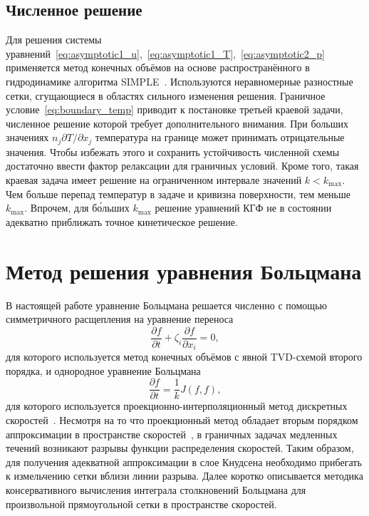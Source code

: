 \documentclass[
aps,%
12pt,%
final,%
notitlepage,%
oneside,%
onecolumn,%
nobibnotes,%
nofootinbib,%
superscriptaddress,%
noshowpacs,%
showkeys,%
centertags]%
{revtex4}
\newcommand{\pder}[2][]{\frac{\partial#1}{\partial#2}}
\newcommand{\Pder}[2][]{\partial#1/\partial#2}
\begin{document}
\subsection{Численное решение}

Для решения системы уравнений~\eqref{eq:asymptotic1_u},~\eqref{eq:asymptotic1_T},~\eqref{eq:asymptotic2_p}
применяется метод конечных объёмов на основе распространённого в гидродинамике алгоритма SIMPLE~\cite{Aoki2007}.
Используются неравномерные разностные сетки, сгущающиеся в областях сильного изменения решения.
Граничное условие~\eqref{eq:boundary_temp} приводит к постановке третьей краевой задачи,
численное решение которой требует дополнительного внимания.
При больших значениях \(n_j\Pder[T]{x_j}\) температура на границе может принимать отрицательные значения.
Чтобы избежать этого и сохранить устойчивость численной схемы достаточно ввести фактор релаксации для граничных условий.
Кроме того, такая краевая задача имеет решение на ограниченном интервале значений \(k<k_{\max}\).
Чем больше перепад температур в задаче и кривизна поверхности, тем меньше \(k_{\max}\).
Впрочем, для б\'{о}льших \(k_{\max}\) решение уравнений КГФ не в состоянии адекватно приближать
точное кинетическое решение.

\section{Метод решения уравнения Больцмана}

В настоящей работе уравнение Больцмана решается численно с помощью
симметричного расщепления на уравнение переноса
\begin{equation}\label{eq:split_advection}
    \pder[f]{t} + \zeta_i\pder[f]{x_i} = 0,
\end{equation}
для которого используется метод конечных объёмов с явной TVD-схемой второго порядка,
и однородное уравнение Больцмана
\begin{equation}\label{eq:split_integral}
    \pder[f]{t} = \frac1k J(f,f),
\end{equation}
для которого используется проекционно-интерполяционный метод дискретных скоростей~\cite{Tcheremissine1997, Tcheremissine2006}.
Несмотря на то что проекционный метод обладает вторым порядком аппроксимации в пространстве скоростей~\cite{Anikin2012},
в граничных задачах медленных течений возникают разрывы функции распределения скоростей.
Таким образом, для получения адекватной аппроксимации в слое Кнудсена необходимо прибегать
к измельчению сетки вблизи линии разрыва.
Далее коротко описывается методика консервативного вычисления интеграла столкновений Больцмана
для произвольной прямоугольной сетки в пространстве скоростей.
\end{document}
